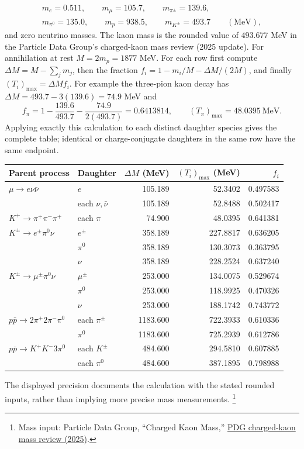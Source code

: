 \begin{gather*}
m_e=0.511,\qquad m_\mu=105.7,\qquad m_{\pi^\pm}=139.6,\\
m_{\pi^0}=135.0,\qquad m_p=938.5,\qquad m_{K^\pm}=493.7
\qquad(\mathrm{MeV}),
\end{gather*}
and zero neutrino masses. The kaon mass is the rounded value of
$493.677$ MeV in the Particle Data Group's charged-kaon mass
review (2025 update). For annihilation at rest $M=2m_p=1877$ MeV.
For each row first compute $\Delta M=M-\sum_jm_j$, then the
fraction $f_i=1-m_i/M-\Delta M/(2M)$, and finally
$(T_i)_{\max}=\Delta M f_i$. For example the three-pion kaon
decay has $\Delta M=493.7-3(139.6)=74.9$ MeV and
\[
f_\pi=1-\frac{139.6}{493.7}-\frac{74.9}{2(493.7)}
=0.6413814,\qquad (T_\pi)_{\max}=48.0395\ \mathrm{MeV}.
\]
Applying exactly this calculation to each distinct daughter species
gives the complete table; identical or charge-conjugate daughters
in the same row have the same endpoint.
\begin{center}\small
\begin{tabular}{llrrr}
\toprule
Parent process & Daughter & $\Delta M$ (MeV) & $(T_i)_{\max}$ (MeV) & $f_i$\\
\midrule
$\mu\to e\nu\bar\nu$ & $e$ &105.189&52.3402&0.497583\\
& each $\nu,\bar\nu$ &105.189&52.8488&0.502417\\
$K^+\to\pi^+\pi^-\pi^+$ & each $\pi$ &74.900&48.0395&0.641381\\
$K^\pm\to e^\pm\pi^0\nu$ & $e^\pm$ &358.189&227.8817&0.636205\\
& $\pi^0$ &358.189&130.3073&0.363795\\
& $\nu$ &358.189&228.2524&0.637240\\
$K^\pm\to\mu^\pm\pi^0\nu$ & $\mu^\pm$ &253.000&134.0075&0.529674\\
& $\pi^0$ &253.000&118.9925&0.470326\\
& $\nu$ &253.000&188.1742&0.743772\\
$p\bar p\to2\pi^+2\pi^-\pi^0$ & each $\pi^\pm$ &1183.600&722.3933&0.610336\\
& $\pi^0$ &1183.600&725.2939&0.612786\\
$p\bar p\to K^+K^-3\pi^0$ & each $K^\pm$ &484.600&294.5810&0.607885\\
& each $\pi^0$ &484.600&387.1895&0.798988\\
\bottomrule
\end{tabular}\end{center}
The displayed precision documents the calculation with the stated
rounded inputs, rather than implying more precise mass measurements.
\footnote{Mass input: Particle Data Group, ``Charged Kaon Mass,''
\href{https://pdg.lbl.gov/2025/reviews/rpp2024-rev-charged-kaon-mass.pdf}{PDG charged-kaon mass review (2025)}.}

